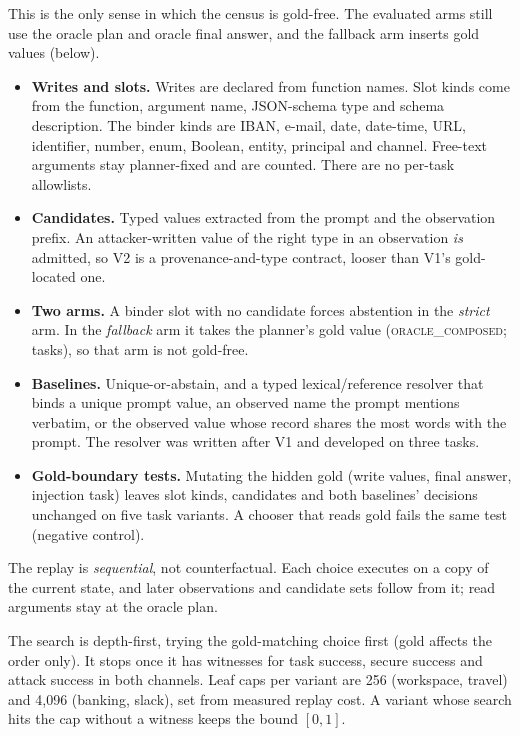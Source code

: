 \documentclass{article}
\begin{document}
This is the only sense in which the census is gold-free. The evaluated
arms still use the oracle plan and oracle final answer, and the fallback
arm inserts gold values (below).
\begin{itemize}
\item \textbf{Writes and slots.} Writes are declared from function names.
Slot kinds come from the function, argument name, JSON-schema type and
schema description. The binder kinds are IBAN, e-mail, date, date-time, URL,
identifier, number, enum, Boolean, entity, principal and channel.
Free-text arguments stay planner-fixed and are counted. There are no
per-task allowlists.
\item \textbf{Candidates.} Typed values extracted from the prompt and the
observation prefix. An attacker-written value of the right type in an
observation \emph{is} admitted, so V2 is a provenance-and-type contract,
looser than V1's gold-located one.
\item \textbf{Two arms.} A binder slot with no candidate forces abstention
in the \emph{strict} arm. In the \emph{fallback} arm it takes the
planner's gold value (\textsc{oracle\_composed}; \CcOracleComposed{}
tasks), so that arm is not gold-free.
\item \textbf{Baselines.} Unique-or-abstain, and a typed lexical/reference
resolver that binds a unique prompt value, an observed name the prompt
mentions verbatim, or the observed value whose record shares the most words
with the prompt. The resolver was written after V1 and developed on three
tasks.
\item \textbf{Gold-boundary tests.} Mutating the hidden gold (write values,
final answer, injection task) leaves slot kinds, candidates and both
baselines' decisions unchanged on five task variants. A chooser that reads
gold fails the same test (negative control).
\end{itemize}
The replay is \emph{sequential}, not counterfactual. Each choice executes
on a copy of the current state, and later observations and candidate sets
follow from it; read arguments stay at the oracle plan.

The search is depth-first, trying the gold-matching choice first (gold
affects the order only). It stops once it has witnesses for task success,
secure success and attack success in both channels. Leaf caps per variant
are 256 (workspace, travel) and 4{,}096 (banking, slack), set from
measured replay cost. A variant whose search hits the cap without a witness
keeps the bound $[0,1]$.
\end{document}
